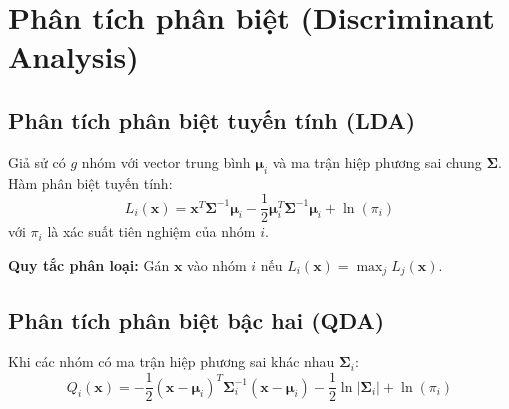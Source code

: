 \section{Phân tích phân biệt (Discriminant Analysis)}

\subsection{Phân tích phân biệt tuyến tính (LDA)}
\begin{dn}
Giả sử có $g$ nhóm với vector trung bình $\boldsymbol{\mu}_i$ và ma trận hiệp phương sai chung $\boldsymbol{\Sigma}$. Hàm phân biệt tuyến tính:
\[
L_i(\mathbf{x}) = \mathbf{x}^T\boldsymbol{\Sigma}^{-1}\boldsymbol{\mu}_i - \frac{1}{2}\boldsymbol{\mu}_i^T\boldsymbol{\Sigma}^{-1}\boldsymbol{\mu}_i + \ln(\pi_i)
\]
với $\pi_i$ là xác suất tiên nghiệm của nhóm $i$.
\end{dn}

\textbf{Quy tắc phân loại:} Gán $\mathbf{x}$ vào nhóm $i$ nếu $L_i(\mathbf{x}) = \max_j L_j(\mathbf{x})$.

\subsection{Phân tích phân biệt bậc hai (QDA)}
Khi các nhóm có ma trận hiệp phương sai khác nhau $\boldsymbol{\Sigma}_i$:
\[
Q_i(\mathbf{x}) = -\frac{1}{2}(\mathbf{x} - \boldsymbol{\mu}_i)^T\boldsymbol{\Sigma}_i^{-1}(\mathbf{x} - \boldsymbol{\mu}_i) - \frac{1}{2}\ln|\boldsymbol{\Sigma}_i| + \ln(\pi_i)
\]

